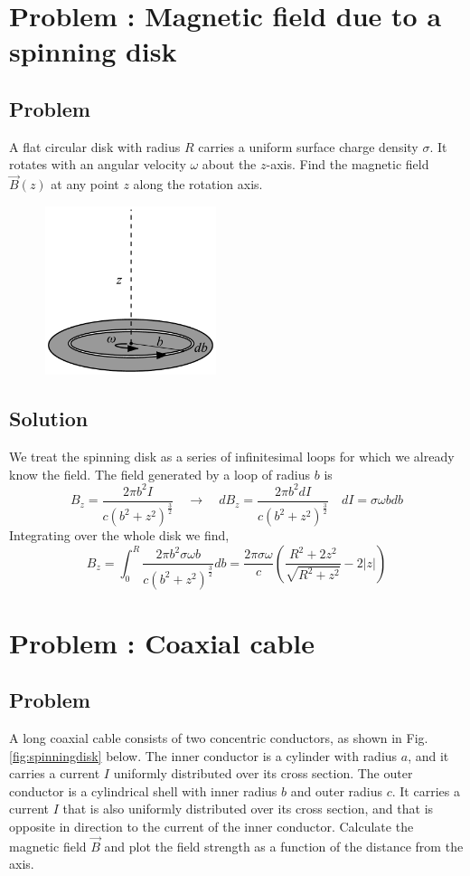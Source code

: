 \documentclass[solutions]{esg8022pset}
\begin{document}
\section{Problem \thesection: Magnetic field due to a spinning disk}
\subsection{Problem}
A flat circular disk with radius $R$ carries a uniform surface charge density
$\sigma$. It rotates with an angular velocity $\omega$ about the $z$-axis.
Find the magnetic field $\vec{B}(z)$ at any point $z$ along the rotation axis.

   \begin{figure}[ht]
    \centering
    \includegraphics[width = 5cm]{Spinningdisk}
    \label{fig:spinningdisk}
  \end{figure}

\subsection{Solution}
We treat the spinning disk as a
series of infinitesimal loops for which we already know the field. The
field generated by a loop of radius $b$ is
$$B_z = \frac{2\pi b^2 I}{c(b^2+z^2)^{\frac{3}{2}}}\quad\rightarrow\quad dB_z = \frac{2\pi b^2 dI}{c(b^2+z^2)^{\frac{3}{2}}} \quad dI = \sigma\omega bdb$$
 Integrating over the whole disk we find,
$$B_z = \int_0^R \frac{2\pi b^2 \sigma\omega
b}{c(b^2+z^2)^{\frac{3}{2}}}db =
\frac{2\pi\sigma\omega}{c}\left(\frac{R^2+2z^2}{\sqrt{R^2+z^2}}-2|z|\right)
$$
\section{Problem \thesection: Coaxial cable}
\subsection{Problem}
A long coaxial cable consists of two concentric conductors, as shown in Fig. \autoref{fig:spinningdisk} below.
The inner conductor is a cylinder with radius $a$, and it carries a current $I$
uniformly distributed over its cross section. The outer conductor is a cylindrical shell with
inner radius $b$ and outer radius $c$. It carries a current $I$ that is also uniformly
distributed over its cross section, and that is opposite in direction to the current of the
inner conductor.  Calculate the magnetic field $\vec{B}$  and plot the field strength as a function of
the distance from the axis.
\end{document}
